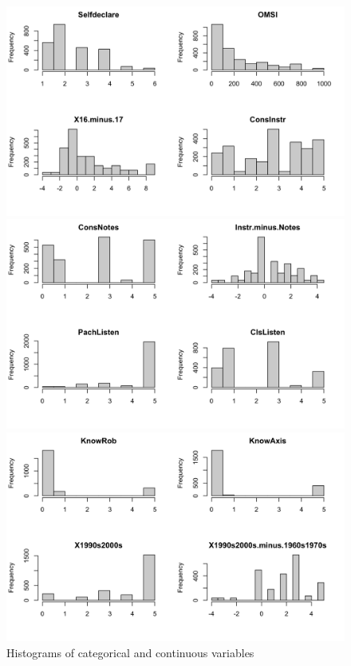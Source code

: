 \documentclass{article}
\begin{document}
\begin{figure}
    \caption{Histograms of categorical and continuous variables \label{fig:histograms}}
    \bigbreak
    \begin{minipage}[b]{0.5\linewidth}
        \centering
        \includegraphics[width=\linewidth]{000024.png} 
        \vspace{4ex}
    \end{minipage}
    \begin{minipage}[b]{0.5\linewidth}
        \centering
        \includegraphics[width=\linewidth]{000025.png} 
        \vspace{4ex}
    \end{minipage} 
    \begin{minipage}[b]{0.5\linewidth}
        \centering
        \includegraphics[width=\linewidth]{000026.png}

\end{minipage}
\end{figure}
\end{document}
